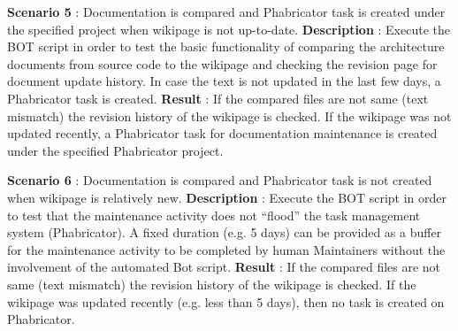 \begin{mdframed}[leftmargin=10pt,rightmargin=10pt]
\textbf{Scenario 5} : Documentation is compared and Phabricator task is created under the specified project when wikipage is not up-to-date.
\newline
\textbf{Description} : Execute the BOT script in order to test the basic functionality of comparing the architecture documents from source code to the wikipage and checking the revision page for document update history. In case the text is not updated in the last few days, a Phabricator task is created.
\newline 
\newline \textbf{Result} : If the compared files are not same (text mismatch) the revision history of the wikipage is checked. If the wikipage was not updated recently, a Phabricator task for documentation maintenance is created under the specified Phabricator project.
\end{mdframed}
\begin{mdframed}[leftmargin=10pt,rightmargin=10pt]
\textbf{Scenario 6} : Documentation is compared and Phabricator task is not created when wikipage is relatively new.
\newline
\newline \textbf{Description} : Execute the BOT script in order to test that the maintenance activity does not \enquote{flood} the task management system (Phabricator). A fixed duration (e.g. 5 days) can be provided as a buffer for the maintenance activity to be completed by human Maintainers without the involvement of the automated Bot script.
\newline 
\newline \textbf{Result} : If the compared files are not same (text mismatch) the revision history of the wikipage is checked. If the wikipage was updated recently (e.g. less than 5 days), then no task is created on Phabricator.
\end{mdframed}

